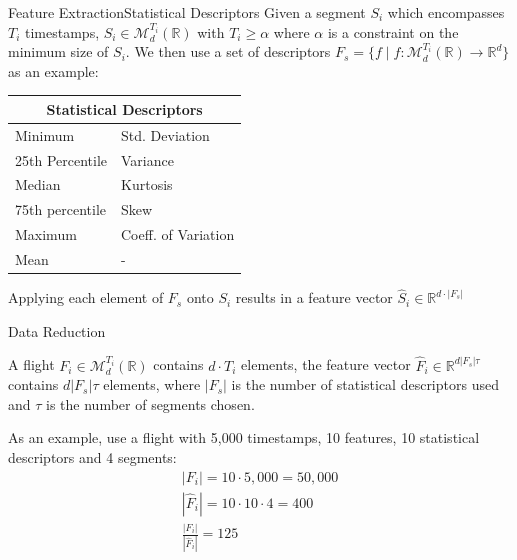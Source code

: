 \documentclass{beamer}
\begin{document}
            \begin{frame}{Feature Extraction}{Statistical Descriptors}
                Given a segment $S_{i}$ which encompasses $T_i$ timestamps, $S_i \in \mathcal{M}_{d}^{T_i}(\mathbb{R})$ with $T_i \geq \alpha$ where $\alpha$ is a constraint on the minimum size of $S_i$. We then use a set of descriptors $F_s = \{f \mid  f: \mathcal{M}_{d}^{T_i}(\mathbb{R}) \rightarrow \mathbb{R}^{d}\}$ as an example:
                \begin{table}[!htbp]
                    \begin{tabular}{ll}
                    \multicolumn{2}{c}{Statistical Descriptors} \\ \hline
                    Minimum & Std. Deviation \\
                    25th Percentile & Variance \\
                    Median & Kurtosis \\
                    75th percentile & Skew \\
                    Maximum & Coeff. of Variation \\
                    Mean & - \\ \hline
                    \end{tabular}
                \end{table}

                Applying each element of $F_s$ onto $S_i$ results in a feature vector $\hat{S}_i \in \mathbb{R}^{d \cdot |F_s|}$
            \end{frame}

            \begin{frame}{Data Reduction}

                A flight $F_i \in \mathcal{M}_{d}^{T_i}(\mathbb{R})$ contains $d \cdot T_i$ elements, the feature vector $\hat{F}_i \in \mathbb{R}^{d |F_s| \tau}$ contains $ d |F_s| \tau$ elements, where $|F_s|$ is the number of statistical descriptors used and $\tau$ is the number of segments chosen.

                As an example, use a flight with 5,000 timestamps, 10 features, 10 statistical descriptors and 4 segments:
                \begin{gather}
                    | F_i | = 10 \cdot 5,000 = 50,000 \\
                    | \hat{F}_i | = 10 \cdot 10 \cdot 4 = 400 \\
                    \frac{ | F_i | }{ | \hat{F}_i | } = 125 \label{eq:data-reduction}
                \end{gather}
            \end{frame}
\end{document}
